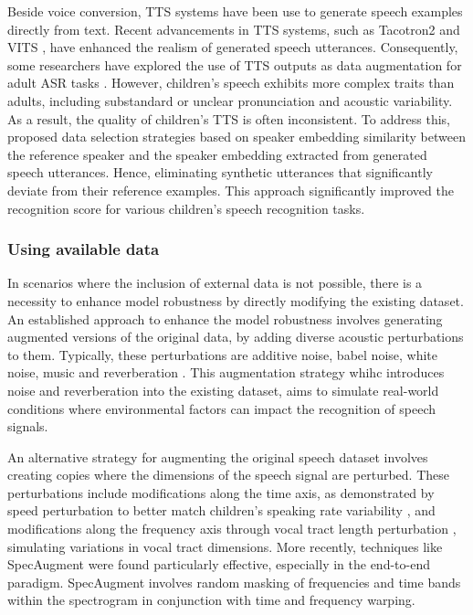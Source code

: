 Beside voice conversion, \ac{TTS} systems have been use to generate speech examples directly from text. Recent advancements in \ac{TTS} systems, such as Tacotron2 \cite{shen2018natural} and \ac{VITS} \cite{kim2021conditional}, have enhanced the realism of generated speech utterances. Consequently, some researchers have explored the use of \ac{TTS} outputs as data augmentation for adult \ac{ASR} tasks \cite{laptev2020you}. However, children's speech exhibits more complex traits than adults, including substandard or unclear pronunciation and acoustic variability. As a result, the quality of children's \ac{TTS} is often inconsistent. To address this, \cite{wang2021towards} proposed data selection strategies based on speaker embedding similarity between the reference speaker and the speaker embedding extracted from generated speech utterances. Hence, eliminating synthetic utterances that significantly deviate from their reference examples. This approach significantly improved the recognition score for various children's speech recognition tasks.

\subsubsection{Using available data}

In scenarios where the inclusion of external data is not possible, there is a necessity to enhance model robustness by directly modifying the existing dataset. An established approach to enhance the model robustness involves generating augmented versions of the original data, by adding diverse acoustic perturbations to them. Typically, these perturbations are additive noise, babel noise, white noise, music and reverberation \cite{liu2003noise,whitenoise,gelin2020babble,couvreur2000use,malek2017robust}. This augmentation strategy whihc introduces noise and reverberation into the existing dataset, aims to simulate real-world conditions where environmental factors can impact the recognition of speech signals.

An alternative strategy for augmenting the original speech dataset involves creating copies where the dimensions of the speech signal are perturbed. These perturbations include modifications along the time axis, as demonstrated by speed perturbation to better match children's speaking rate variability \cite{lo2020ntnu}, and modifications along the frequency axis \cite{singh2022spectral} through vocal tract length perturbation \cite{VTLP}, simulating variations in vocal tract dimensions. More recently, techniques like SpecAugment \cite{specaugment} were found particularly effective, especially in the end-to-end paradigm. SpecAugment involves random masking of frequencies and time bands within the spectrogram in conjunction with time and frequency warping.

